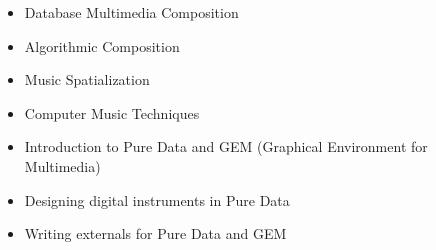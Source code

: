 \begin{itemize}
\itemsep0em 
\item Database Multimedia Composition
\item Algorithmic Composition
\item Music Spatialization
\item Computer Music Techniques
\item Introduction to Pure Data and GEM (Graphical Environment for Multimedia)
\item Designing digital instruments in Pure Data
\item Writing externals for Pure Data and GEM
\end{itemize}